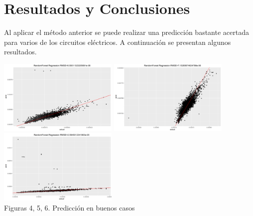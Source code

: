 \documentclass[../Main.tex]{subfiles}
\begin{document}
\section{Resultados y Conclusiones}
Al aplicar el método anterior se puede realizar una predicción bastante acertada para varios de los circuitos eléctricos. A continuación se presentan algunos resultados.

\begin{center}
\includegraphics[width=2.25in]{Assets/Predict_24_.png}
\includegraphics[width=2.25in]{Assets/Predict_5_.png}
\includegraphics[width=2.25in]{Assets/Predict_29_.png}
\\Figuras 4, 5, 6. Predicción en buenos casos
\end{center}
\end{document}
